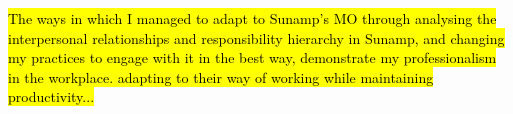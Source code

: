 \hl{The ways in which 
I managed to adapt to Sunamp's MO through analysing the interpersonal relationships and responsibility hierarchy in Sunamp, and changing my practices to engage with it in the best way, demonstrate my professionalism in the workplace.
adapting to their way of working while maintaining productivity...}

